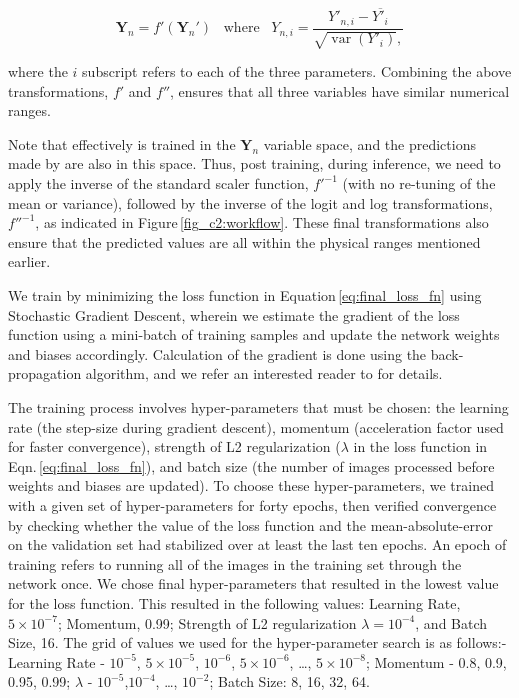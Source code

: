 \begin{equation}
\boldsymbol{Y}_n = f'(\boldsymbol{Y}_n')\,\,\,\,\,\mathrm{where}\,\,\,\,\,{Y}_{n,i} = \frac{Y'_{n,i} - \overline{Y'_{i}}}{\sqrt{\operatorname{var}(Y'_{i})} ,} 
\label{eq:transformation_f'}
\end{equation}

\noindent
where the $i$ subscript refers to each of the three parameters. Combining the above transformations, $f'$ and $f''$, ensures that all three variables have similar numerical ranges.  

Note that effectively \gampen{} is trained in the $\boldsymbol{Y}_n$ variable space, and the predictions made by \gampen{} are also in this space. Thus, post training, during inference, we need to apply the inverse of the standard scaler function, $f'^{-1}$ (with no re-tuning of the mean or variance), followed by the inverse of the logit and log transformations, $f''^{-1}$, as indicated in Figure\,\ref{fig_c2:workflow}. These final transformations also ensure that the predicted values are all within the physical ranges mentioned earlier.

We train \gampen{} by minimizing the loss function in Equation\,\ref{eq:final_loss_fn} using Stochastic Gradient Descent, wherein we estimate the gradient of the loss function using a mini-batch of training samples and update the network weights and biases accordingly. Calculation of the gradient is done using the back-propagation algorithm, and we refer an interested reader to \citet{rumelhart_88} for details.

The training process involves hyper-parameters that must be chosen: the learning rate (the step-size during gradient descent), momentum (acceleration factor used for faster convergence), strength of L2 regularization ($\lambda$ in the loss function in Eqn.\,\ref{eq:final_loss_fn}), and batch size (the number of images processed before weights and biases are updated).
To choose these hyper-parameters, we trained \gampen{} with a given set of hyper-parameters for forty epochs, then verified convergence by checking whether the value of the loss function and the mean-absolute-error on the validation set had stabilized over at least the last ten epochs. An epoch of training refers to running all of the images in the training set through the network once. We chose final hyper-parameters that resulted in the lowest value for the loss function. This resulted in the following values: Learning Rate, $5\times10^{-7}$; Momentum, 0.99; Strength of L2 regularization $\lambda=10^{-4}$, and Batch Size, 16. The grid of values we used for the hyper-parameter search is as follows:- Learning Rate - $10^{-5}$, $5 \times 10^{-5}$, $10^{-6}$, $5 \times 10^{-6}$, \ldots,  $5 \times 10^{-8}$; Momentum - 0.8, 0.9, 0.95, 0.99; $\lambda$ - $10^{-5}$,$10^{-4}$, \ldots, $10^{-2}$; Batch Size: 8, 16, 32, 64.

